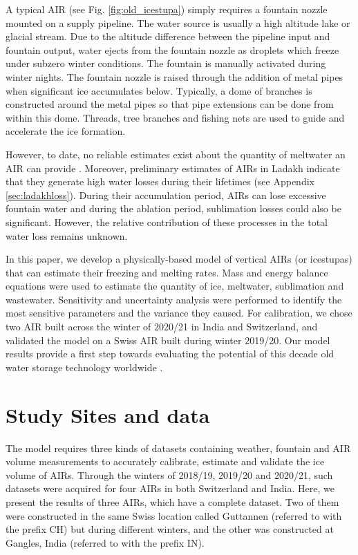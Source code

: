 \documentclass[utf8]{frontiersSCNS}
\begin{document}
A typical AIR (see Fig. \ref{fig:old_icestupa}) simply requires a fountain nozzle mounted on a supply pipeline.
The water source is usually a high altitude lake or glacial stream. Due to the altitude difference between the
pipeline input and fountain output, water ejects from the fountain nozzle as droplets which freeze under subzero
winter conditions. The fountain is manually activated during winter nights. The fountain nozzle is raised
through the addition of metal pipes when significant ice accumulates below.  Typically, a dome of branches is
constructed around the metal pipes so that pipe extensions can be done from within this dome. Threads, tree
branches and fishing nets are used to guide and accelerate the ice formation.

However, to date, no reliable estimates exist about the quantity of meltwater an AIR can provide
\citep{Nusser_2018}. Moreover, preliminary estimates of AIRs in Ladakh indicate that they generate high water
losses during their lifetimes (see Appendix \ref{sec:ladakhloss}). During their accumulation period, AIRs can
lose excessive fountain water and during the ablation period, sublimation losses could also be significant.
However, the relative contribution of these processes in the total water loss remains unknown.

In this paper, we develop a physically-based model of vertical AIRs (or icestupas) that can estimate their
freezing and melting rates. Mass and energy balance equations were used to estimate the quantity of ice,
meltwater, sublimation and wastewater. Sensitivity and uncertainty analysis were performed to identify the most
sensitive parameters and the variance they caused. For calibration, we chose two AIR built across the winter of
2020/21 in India and Switzerland, and validated the model on a Swiss AIR built during winter 2019/20. Our model
results provide a first step towards evaluating the potential of this decade old water storage technology
worldwide \citep{campaign}.

\section{Study Sites and data}

The model requires three kinds of datasets containing weather, fountain and AIR volume measurements to
accurately calibrate, estimate and validate the ice volume of AIRs. Through the winters of 2018/19, 2019/20 and
2020/21, such datasets were acquired for four AIRs in both Switzerland and India. Here, we present the results of
three AIRs, which have a complete dataset. Two of them were constructed in the same Swiss location called
Guttannen (referred to with the prefix CH) but during different winters, and the other was constructed at
Gangles, India (referred to with the prefix IN).
\end{document}
